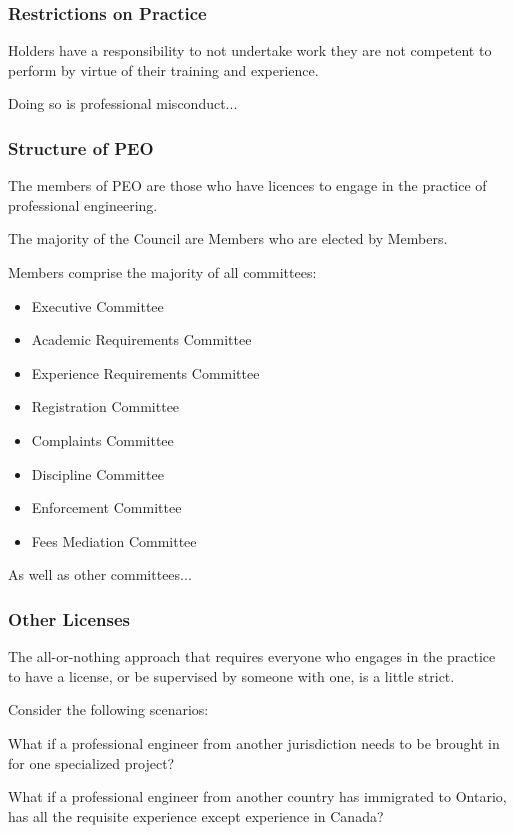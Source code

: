 \begin{frame}
\frametitle{Restrictions on Practice}

Holders have a responsibility to not undertake work they are not competent to perform by virtue of their training and experience.

Doing so is professional misconduct...

\end{frame}



\begin{frame}
\frametitle{Structure of PEO}

The members of PEO are those who have licences to engage in the practice of professional engineering.

The majority of the Council are Members who are elected by Members.

Members comprise the majority of all committees:

\begin{itemize}
\item Executive Committee
\item Academic Requirements Committee
\item Experience Requirements Committee
\item Registration Committee
\item Complaints Committee
\item Discipline Committee
\item Enforcement Committee
\item Fees Mediation Committee
\end{itemize}

As well as other committees...

\end{frame}



\begin{frame}
\frametitle{Other Licenses}

The all-or-nothing approach that requires everyone who engages in the practice to have a license, or be supervised by someone with one, is a little strict.

Consider the following scenarios:

What if a professional engineer from another jurisdiction needs to be brought in for one specialized project?

What if a professional engineer from another country has immigrated to Ontario, has all the requisite experience except experience in Canada?

\end{frame}





